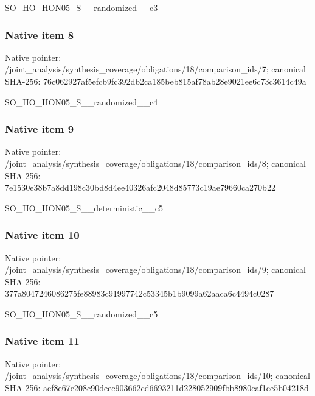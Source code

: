 \documentclass[10pt,a4paper]{article}
\begin{document}
\begingroup\raggedright\sloppy SO\_\allowbreak{}HO\_\allowbreak{}HON05\_\allowbreak{}S\_\allowbreak{}\_\allowbreak{}randomized\_\allowbreak{}\_\allowbreak{}c3\par\endgroup

\subsubsection{Native item 8}
Native pointer: /joint\_\allowbreak{}analysis/synthesis\_\allowbreak{}coverage/obligations/18/comparison\_\allowbreak{}ids/7; canonical SHA-256: 76c062927af5efcb9fc392db2ca185beb815af78ab28e9021ee6c73c3614c49a

\begingroup\raggedright\sloppy SO\_\allowbreak{}HO\_\allowbreak{}HON05\_\allowbreak{}S\_\allowbreak{}\_\allowbreak{}randomized\_\allowbreak{}\_\allowbreak{}c4\par\endgroup

\subsubsection{Native item 9}
Native pointer: /joint\_\allowbreak{}analysis/synthesis\_\allowbreak{}coverage/obligations/18/comparison\_\allowbreak{}ids/8; canonical SHA-256: 7e1530e38b7a8dd198c30bd8d4ee40326afc2048d85773c19ae79660ca270b22

\begingroup\raggedright\sloppy SO\_\allowbreak{}HO\_\allowbreak{}HON05\_\allowbreak{}S\_\allowbreak{}\_\allowbreak{}deterministic\_\allowbreak{}\_\allowbreak{}c5\par\endgroup

\subsubsection{Native item 10}
Native pointer: /joint\_\allowbreak{}analysis/synthesis\_\allowbreak{}coverage/obligations/18/comparison\_\allowbreak{}ids/9; canonical SHA-256: 377a8047246086275fe88983c91997742c53345b1b9099a62aaca6c4494c0287

\begingroup\raggedright\sloppy SO\_\allowbreak{}HO\_\allowbreak{}HON05\_\allowbreak{}S\_\allowbreak{}\_\allowbreak{}randomized\_\allowbreak{}\_\allowbreak{}c5\par\endgroup

\subsubsection{Native item 11}
Native pointer: /joint\_\allowbreak{}analysis/synthesis\_\allowbreak{}coverage/obligations/18/comparison\_\allowbreak{}ids/10; canonical SHA-256: aef8e67e208c90deec903662cd6693211d228052909fbb8980caf1ce5b04218d
\end{document}
